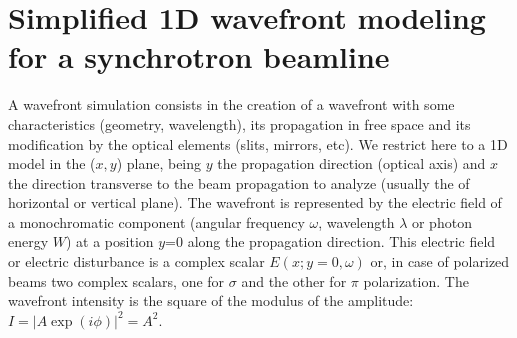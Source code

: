 \documentclass{iucr}              %
\begin{document}


\section{Simplified 1D wavefront modeling for a synchrotron beamline}


A wavefront simulation consists in the creation of a wavefront with some characteristics (geometry, wavelength), its propagation in free space and its modification by the optical elements (slits, mirrors, etc). We restrict here to a 1D model in the ($x,y$) plane, being $y$ the propagation direction (optical axis) and $x$ the direction transverse to the beam propagation to analyze (usually the of horizontal or vertical plane). The wavefront is represented by the electric field of a monochromatic component (angular frequency $\omega$, wavelength $\lambda$ or photon energy $W$) at a position $y$=0 along the propagation direction. This electric field or electric disturbance is a complex scalar $E(x;y=0,\omega)$ or, in case of polarized beams two complex scalars, one for $\sigma$ and the other for $\pi$ polarization. The wavefront intensity is the square of the modulus of the amplitude: $I=|A \exp{(i\phi)}|^2=A^2$. 
\end{document}
